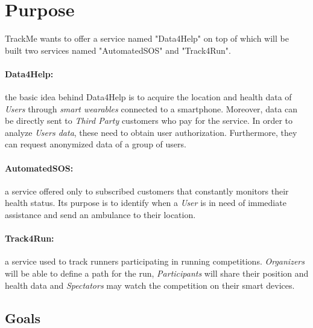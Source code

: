 \documentclass[../../rasd.tex]{subfiles}
\begin{document}
\section{Purpose}
			
			TrackMe wants to offer a service named "Data4Help" on top of which will be built two services named "AutomatedSOS" and "Track4Run".
			\paragraph{Data4Help:} the basic idea behind Data4Help is to acquire the location and health data of \textit{Users} through \textit{smart wearables} connected to a smartphone. Moreover, data can be directly sent to \textit{Third Party} customers who pay for the service. In order to analyze \textit{Users data}, these need to obtain user authorization. Furthermore, they can request anonymized data of a group of users.
			
			\paragraph{AutomatedSOS:} a service offered only to subscribed customers that constantly monitors their health status. Its purpose is to identify when a \textit{User} is in need of immediate assistance and send an ambulance to their location.
			
			\paragraph{Track4Run:} a service used to track runners participating in running competitions. \textit{Organizers} will be able to define a path for the run, \textit{Participants} will share their position and health data  and \textit{Spectators} may watch the competition on their smart devices.
			
			\subsection{Goals}
\end{document}
